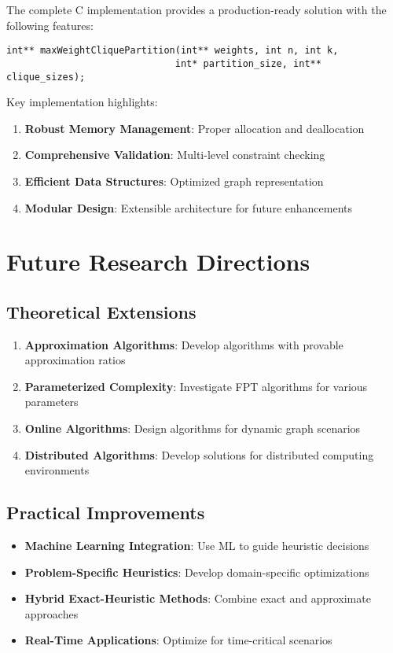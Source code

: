 \documentclass[12pt,a4paper]{article}
\begin{document}
The complete C implementation provides a production-ready solution with the following features:

\begin{lstlisting}[caption=Core Function Signature]
int** maxWeightCliquePartition(int** weights, int n, int k, 
                              int* partition_size, int** clique_sizes);
\end{lstlisting}

Key implementation highlights:

\begin{enumerate}
    \item \textbf{Robust Memory Management}: Proper allocation and deallocation
    \item \textbf{Comprehensive Validation}: Multi-level constraint checking
    \item \textbf{Efficient Data Structures}: Optimized graph representation
    \item \textbf{Modular Design}: Extensible architecture for future enhancements
\end{enumerate}

\section{Future Research Directions}

\subsection{Theoretical Extensions}

\begin{enumerate}
    \item \textbf{Approximation Algorithms}: Develop algorithms with provable approximation ratios
    \item \textbf{Parameterized Complexity}: Investigate FPT algorithms for various parameters
    \item \textbf{Online Algorithms}: Design algorithms for dynamic graph scenarios
    \item \textbf{Distributed Algorithms}: Develop solutions for distributed computing environments
\end{enumerate}

\subsection{Practical Improvements}

\begin{itemize}
    \item \textbf{Machine Learning Integration}: Use ML to guide heuristic decisions
    \item \textbf{Problem-Specific Heuristics}: Develop domain-specific optimizations
    \item \textbf{Hybrid Exact-Heuristic Methods}: Combine exact and approximate approaches
    \item \textbf{Real-Time Applications}: Optimize for time-critical scenarios
\end{itemize}
\end{document}
